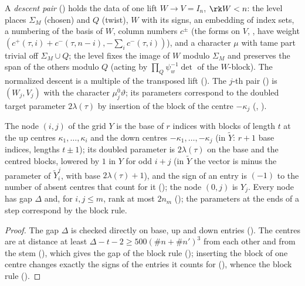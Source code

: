 A \emph{descent pair} () holds the data of one lift $W\to V=I_n$, $\rk W<n$:
the level places $\Sigma_M$ (chosen) and $Q$ (twist), $W$ with its signs, an embedding of index sets, a
numbering of the basis of $W$, column numbers $c^\pm$ (the forms on $V$,
, have weight $(c^+(\tau,i)+c^-(\tau,n-i),-\sum_ic^-(\tau,i))$), and a
character $\mu$ with tame part trivial off $\Sigma_M\cup Q$; the level fixes the image of $W$ modulo $\Sigma_M$
and preserves the span of the others modulo $Q$ (acting by $\prod_Q\psi_w^{-1}\det$ of the
$W$-block). The normalized descent is a multiple of the transposed lift
(). The $j$-th pair
() is $(W_j,V_j)$ with the character $\mu^0_j\vartheta$; its parameters
correspond to the doubled target parameter $2\lambda(\tau)$ by insertion of the block of the centre $-\kappa_j$
(, ).

\begin{lemma}\label{ub-objects:lem:grids}
The node $(i,j)$ of the grid $Y$ is the base of $r$ indices with blocks of length $t$ at the up
centres $\kappa_1,\dots,\kappa_i$ and the down centres $-\kappa_1,\dots,-\kappa_j$ (in $\tilde Y$:
$r+1$ base indices, lengths $t\pm1$); its doubled parameter is $2\lambda(\tau)$ on the base and the
centred blocks, lowered by $1$ in $Y$ for odd $i+j$ (in $\tilde Y$ the vector is minus the parameter of
$\tilde Y^j_i$, with base $2\lambda(\tau)+1$), and the sign of an entry is $(-1)$ to the
number of absent centres that count for it (); the node $(0,j)$ is
$Y_j$. Every node has gap $\Delta$ and, for $i,j\le m$, rank at most $2n_m$
(); the parameters at the ends of a step correspond by the block
rule.
\end{lemma}

\begin{proof}
The gap $\Delta$ is checked directly on base, up and down entries ().
The centres are at distance at least $\Delta-t-2\ge500(\#n+\#n')^3$ from each other and from the
stem (), which gives the gap of the block rule
(); inserting the block of one centre changes exactly the signs
of the entries it counts for (), whence the block rule
().
\end{proof}
